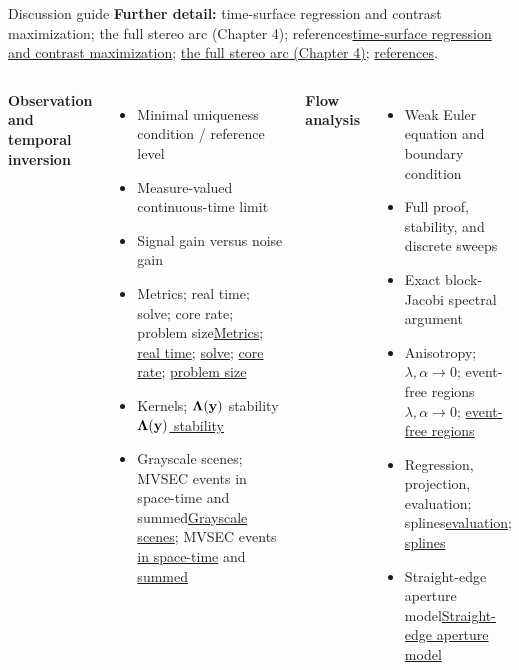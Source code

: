 \begin{frame}{Discussion guide}
\fontsize{8}{9.5}\selectfont
{\scriptsize\textbf{Further detail:} \ifdefined\DefenseNotes time-surface regression and contrast maximization; the full stereo arc (Chapter 4); references\else\hyperlink{flowdetails}{time-surface regression and contrast maximization}; \hyperlink{stereoarc}{the full stereo arc (Chapter 4)}; \hyperlink{references}{references}\fi.}\par\vspace{-1mm}
\begin{columns}[T]
\textbf{Observation and temporal inversion}
\begin{itemize}
\item Minimal uniqueness condition / reference level
\item Measure-valued continuous-time limit
\item Signal gain versus noise gain
\item \ifdefined\DefenseNotes Metrics; real time; solve; core rate; problem size\else\hyperlink{metricguide}{Metrics}; \hyperlink{realtime}{real time}; \hyperlink{tridiagcost}{solve}; \hyperlink{corerate}{core rate}; \hyperlink{temporalcost}{problem size}\fi
\item Kernels; \ifdefined\DefenseNotes $\bm\Lambda(\mathbf y)$ stability\else\hyperlink{adaptivelipschitz}{$\bm\Lambda(\mathbf y)$ stability}\fi
\item \ifdefined\DefenseNotes Grayscale scenes; MVSEC events in space-time and summed\else\hyperlink{scenesgray}{Grayscale scenes}; MVSEC events \hyperlink{mvsecevents3d}{in space-time} and \hyperlink{mvsecaccum}{summed}\fi
\end{itemize}
\textbf{Flow analysis}
\begin{itemize}
\item Weak Euler equation and boundary condition
\item Full proof, stability, and discrete sweeps
\item Exact block-Jacobi spectral argument
\item Anisotropy; \ifdefined\DefenseNotes $\lambda,\alpha\to0$; event-free regions\else\hyperlink{weakreg}{$\lambda,\alpha\to0$}; \hyperlink{harmonicfill}{event-free regions}\fi
\item Regression, projection, \ifdefined\DefenseNotes evaluation; splines\else\hyperlink{flowprotocol}{evaluation}; \hyperlink{splinecoercive}{splines}\fi
\item \ifdefined\DefenseNotes Straight-edge aperture model\else\hyperlink{aperturemodel}{Straight-edge aperture model}\fi

\end{itemize}
\end{columns}
\end{frame}
